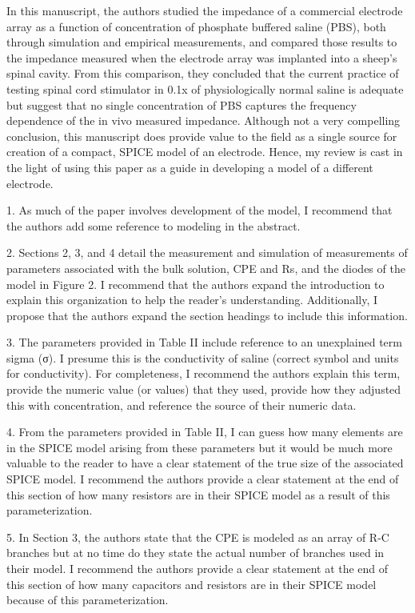 \documentclass[journal, a4paper]{IEEEtran}
\begin{document}
{
    \color{OliveGreen}
    In this manuscript, the authors studied the impedance of a commercial electrode array as a function of concentration of phosphate buffered saline (PBS), both through simulation and empirical measurements, and compared those results to the impedance measured when the electrode array was implanted into a sheep's spinal cavity. From this comparison, they concluded that the current practice of testing spinal cord stimulator in 0.1x of physiologically normal saline is adequate but suggest that no single concentration of PBS captures the frequency dependence of the in vivo measured impedance. Although not a very compelling conclusion, this manuscript does provide value to the field as a single source for creation of a compact, SPICE model of an electrode. Hence, my review is cast in the light of using this paper as a guide in developing a model of a different electrode.

    1. As much of the paper involves development of the model, I recommend that the authors add some reference to modeling in the abstract.

    2. Sections 2, 3, and 4 detail the measurement and simulation of measurements of parameters associated with the bulk solution, CPE and Rs, and the diodes of the model in Figure 2. I recommend that the authors expand the introduction to explain this organization to help the reader's understanding. Additionally, I propose that the authors expand the section headings to include this information.

    3. The parameters provided in Table II include reference to an unexplained term sigma (σ). I presume this is the conductivity of saline (correct symbol and units for conductivity). For completeness, I recommend the authors explain this term, provide the numeric value (or values) that they used, provide how they adjusted this with concentration, and reference the source of their numeric data.

    4. From the parameters provided in Table II, I can guess how many elements are in the SPICE model arising from these parameters but it would be much more valuable to the reader to have a clear statement of the true size of the associated SPICE model. I recommend the authors provide a clear statement at the end of this section of how many resistors are in their SPICE model as a result of this parameterization.

    5. In Section 3, the authors state that the CPE is modeled as an array of R-C branches but at no time do they state the actual number of branches used in their model. I recommend the authors provide a clear statement at the end of this section of how many capacitors and resistors are in their SPICE model because of this parameterization.

}
\end{document}
